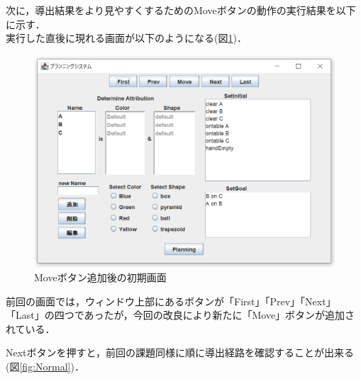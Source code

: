 \documentclass[12pt]{jarticle}
\begin{document}
次に，導出結果をより見やすくするためのMoveボタンの動作の実行結果を以下に示す．\\

実行した直後に現れる画面が以下のようになる(図\ref{fig:FirstPage})．\\

\begin{figure}[htbp]
  \begin{center}
    \includegraphics[scale=0.8]{images/FirstPage.PNG}
    \caption{Moveボタン追加後の初期画面}
    \label{fig:FirstPage}
  \end{center}
\end{figure}
前回の画面では，ウィンドウ上部にあるボタンが「First」「Prev」「Next」「Last」の四つであったが，今回の改良により新たに「Move」ボタンが追加されている．\\

\clearpage

Nextボタンを押すと，前回の課題同様に順に導出経路を確認することが出来る(図\ref{fig:Normal})．\\
\end{document}
